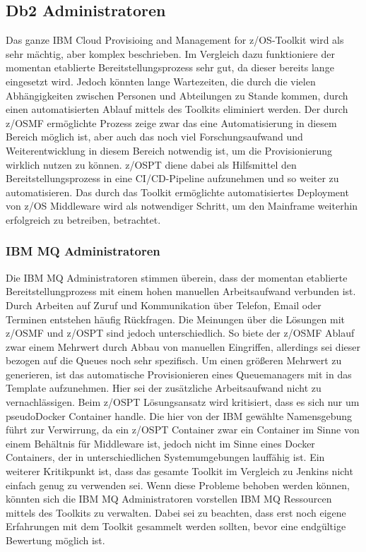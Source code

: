 \subsection{Db2 Administratoren}
Das ganze \glqq IBM Cloud Provisioing and Management for z/OS\grqq-Toolkit wird als sehr mächtig, aber komplex beschrieben.
Im Vergleich dazu funktioniere der momentan etablierte Bereitstellungsprozess sehr gut, da dieser bereits lange eingesetzt wird.
Jedoch könnten lange Wartezeiten, die durch die vielen Abhängigkeiten zwischen Personen und Abteilungen zu Stande kommen, durch einen automatisierten Ablauf mittels des Toolkits eliminiert werden.
Der durch z/OSMF ermöglichte Prozess zeige zwar das eine Automatisierung in diesem Bereich möglich ist, aber auch das noch viel Forschungsaufwand und Weiterentwicklung in diesem Bereich notwendig ist, um die Provisionierung wirklich nutzen zu können.
z/OSPT diene dabei als Hilfsmittel den Bereitstellungsprozess in eine CI/CD-Pipeline aufzunehmen und so weiter zu automatisieren.
Das durch das Toolkit ermöglichte automatisiertes Deployment von z/OS Middleware wird als notwendiger Schritt, um den Mainframe weiterhin erfolgreich zu betreiben, betrachtet.

\subsubsection{IBM MQ Administratoren}
Die IBM MQ Administratoren stimmen überein, dass der momentan etablierte Bereitstellungprozess mit einem hohen manuellen Arbeitsaufwand verbunden ist.
Durch Arbeiten auf Zuruf und Kommunikation über Telefon, Email oder Terminen entstehen häufig Rückfragen.
Die Meinungen über die Lösungen mit z/OSMF und z/OSPT sind jedoch unterschiedlich.
So biete der z/OSMF Ablauf zwar einem Mehrwert durch Abbau von manuellen Eingriffen, allerdings sei dieser bezogen auf die Queues noch sehr spezifisch.
Um einen größeren Mehrwert zu generieren, ist das automatische Provisionieren eines Queuemanagers mit in das Template aufzunehmen.
Hier sei der zusätzliche Arbeitsaufwand nicht zu vernachlässigen.
Beim z/OSPT Lösungsansatz wird kritisiert, dass es sich nur um \glqq pseudo\grqq Docker Container handle.
Die hier von der IBM gewählte Namensgebung führt zur Verwirrung, da ein z/OSPT Container zwar ein Container im Sinne von einem Behältnis für Middleware ist, jedoch nicht im Sinne eines Docker Containers, der in unterschiedlichen Systemumgebungen lauffähig ist.
Ein weiterer Kritikpunkt ist, dass das gesamte Toolkit im Vergleich zu Jenkins nicht einfach genug zu verwenden sei.
Wenn diese Probleme behoben werden können, könnten sich die IBM MQ Administratoren vorstellen IBM MQ Ressourcen mittels des Toolkits zu verwalten.
Dabei sei zu beachten, dass erst noch eigene Erfahrungen mit dem Toolkit gesammelt werden sollten, bevor eine endgültige Bewertung möglich ist.

